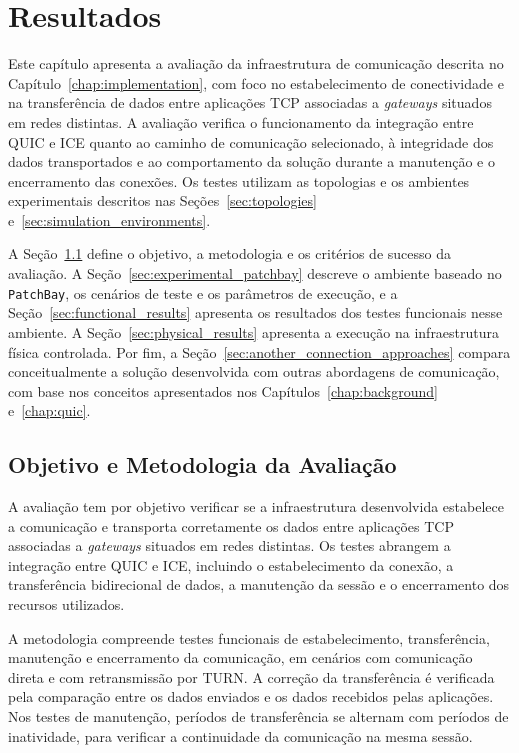 \chapter{Resultados}
\label{chap:results}

Este capítulo apresenta a avaliação da infraestrutura de comunicação descrita no Capítulo~\ref{chap:implementation}, com foco no estabelecimento de conectividade e na transferência de dados entre aplicações TCP associadas a \textit{gateways} situados em redes distintas. A avaliação verifica o funcionamento da integração entre QUIC e ICE quanto ao caminho de comunicação selecionado, à integridade dos dados transportados e ao comportamento da solução durante a manutenção e o encerramento das conexões. Os testes utilizam as topologias e os ambientes experimentais descritos nas Seções~\ref{sec:topologies} e~\ref{sec:simulation_environments}.

A Seção~\ref{sec:evaluation_methodology} define o objetivo, a metodologia e os critérios de sucesso da avaliação. A Seção~\ref{sec:experimental_patchbay} descreve o ambiente baseado no \texttt{PatchBay}, os cenários de teste e os parâmetros de execução, e a Seção~\ref{sec:functional_results} apresenta os resultados dos testes funcionais nesse ambiente. A Seção~\ref{sec:physical_results} apresenta a execução na infraestrutura física controlada. Por fim, a Seção~\ref{sec:another_connection_approaches} compara conceitualmente a solução desenvolvida com outras abordagens de comunicação, com base nos conceitos apresentados nos Capítulos~\ref{chap:background} e~\ref{chap:quic}.

\section{Objetivo e Metodologia da Avaliação}
\label{sec:evaluation_methodology}

A avaliação tem por objetivo verificar se a infraestrutura desenvolvida estabelece a comunicação e transporta corretamente os dados entre aplicações TCP associadas a \textit{gateways} situados em redes distintas. Os testes abrangem a integração entre QUIC e ICE, incluindo o estabelecimento da conexão, a transferência bidirecional de dados, a manutenção da sessão e o encerramento dos recursos utilizados.

A metodologia compreende testes funcionais de estabelecimento, transferência, manutenção e encerramento da comunicação, em cenários com comunicação direta e com retransmissão por TURN. A correção da transferência é verificada pela comparação entre os dados enviados e os dados recebidos pelas aplicações. Nos testes de manutenção, períodos de transferência se alternam com períodos de inatividade, para verificar a continuidade da comunicação na mesma sessão.

